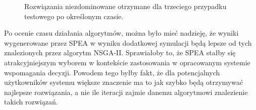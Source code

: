 \documentclass[twoside]{iisthesis}
\begin{document}
\begin{figure}
    \hfill
{}
    \hfill
{}
    \hfill
{}
\caption{Rozwiązania niezdominowane otrzymane dla trzeciego przypadku testowego po określonym czasie.}
    \label{fig:big_time_results}
\end{figure}
Po ocenie czasu działania algorytmów, można było mieć nadzieję, że wyniki wygenerowane przez SPEA w wyniku dodatkowej symulacji będą lepsze od tych znalezionych przez algorytm NSGA-II. Sprawiałoby to, że SPEA stałby się atrakcyjniejszym wyborem w kontekście zastosowania w opracowanym systemie wspomagania decyzji. Powodem tego byłby fakt, że dla potencjalnych użytkowników systemu większe znaczenie ma to jak szybko będą otrzymywać najlepsze rozwiązania, a nie ile iteracji zajmie danemu algorytmowi znalezienie takich rozwiązań.
\end{document}
